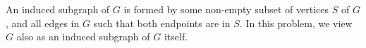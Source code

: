 An induced subgraph of $G$ is formed by some non-empty subset of vertices $S$ of $G$, and all edges in $G$ such that both endpoints are in $S$.
In this problem, we view $G$ also as an induced subgraph of $G$ itself.